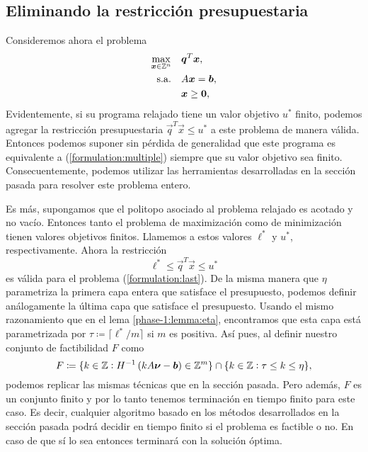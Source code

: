 \subsection{Eliminando la restricción presupuestaria}
\noindent
Consideremos ahora el problema
\begin{subequations}
	\label{formulation:last}
	\begin{align}
		\max_{\boldsymbol{x} \in \mathbb{Z}^n} \quad
			& \boldsymbol{q}^T\boldsymbol{x}, \label{formulation:last:objective} \\
		\text{s.a.} \quad
			& A\boldsymbol{x} = \boldsymbol{b}, \label{formulation:last:constraints} \\
			& \boldsymbol{x} \geq \boldsymbol{0}, \nonumber
	\end{align}
\end{subequations}
Evidentemente, si su programa relajado tiene un valor objetivo $u^*$ finito, podemos agregar la
restricción presupuestaria $\vec{q}^T\vec{x} \leq u^*$ a este problema de manera válida. Entonces
podemos suponer sin pérdida de generalidad que este programa es equivalente a
(\ref{formulation:multiple}) siempre que su valor objetivo sea finito. Consecuentemente, podemos
utilizar las herramientas desarrolladas en la sección pasada para resolver este problema entero.

Es más, supongamos que el politopo asociado al problema relajado es acotado y no vacío. Entonces
tanto el problema de maximización como de minimización tienen valores objetivos finitos. Llamemos a
estos valores $\ell^*$ y $u^*$, respectivamente. Ahora la restricción
\begin{equation*}
	\ell^* \leq \vec{q}^T\vec{x} \leq u^*
\end{equation*}
es válida para el problema (\ref{formulation:last}). De la misma manera que $\eta$ parametriza la
primera capa entera que satisface el presupuesto, podemos definir análogamente la última capa que
satisface el presupuesto. Usando el mismo razonamiento que en el lema \ref{phase-1:lemma:eta},
encontramos que esta capa está parametrizada por $\tau \coloneq \lceil \ell^*/m \rceil$ si $m$ es
positiva. Así pues, al definir nuestro conjunto de factibilidad $F$ como
\begin{equation*}
	F \coloneq \lbrace k \in \mathbb{Z} \vcentcolon H^{-1}\left(kA\boldsymbol{\nu} - \boldsymbol{b}\right) \in \mathbb{Z}^m \rbrace
	\cap \lbrace k \in \mathbb{Z} \vcentcolon \tau \leq k \leq \eta \rbrace,
\end{equation*}
podemos replicar las mismas técnicas que en la sección pasada. Pero además, $F$ es un conjunto
finito y por lo tanto tenemos terminación en tiempo finito para este caso. Es decir, cualquier
algoritmo basado en los métodos desarrollados en la sección pasada podrá decidir en tiempo finito si
el problema es factible o no. En caso de que sí lo sea entonces terminará con la solución óptima.

